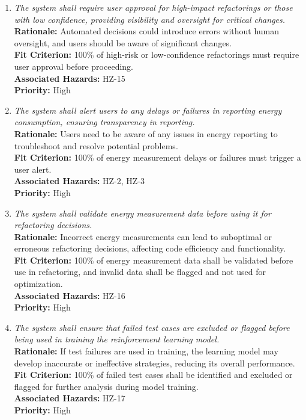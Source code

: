 \documentclass{article}
\begin{document}
\begin{enumerate}[label=SCR \arabic*., wide=0pt, leftmargin=*]
    \item \emph{The system shall require user approval for high-impact refactorings or those with low confidence, providing visibility and oversight for critical changes.}\\
    {\bf Rationale:} Automated decisions could introduce errors without human oversight, and users should be aware of significant changes.\\
    {\bf Fit Criterion:} 100\% of high-risk or low-confidence refactorings must require user approval before proceeding.\\
    {\bf Associated Hazards:} HZ-15\\
    {\bf Priority:} High

    \item \emph{The system shall alert users to any delays or failures in reporting energy consumption, ensuring transparency in reporting.}\\
    {\bf Rationale:} Users need to be aware of any issues in energy reporting to troubleshoot and resolve potential problems.\\
    {\bf Fit Criterion:} 100\% of energy measurement delays or failures must trigger a user alert.\\
    {\bf Associated Hazards:} HZ-2, HZ-3\\
    {\bf Priority:} High

    \item \emph{The system shall validate energy measurement data before using it for refactoring decisions.}\\
    {\bf Rationale:} Incorrect energy measurements can lead to suboptimal or erroneous refactoring decisions, affecting code efficiency and functionality.\\
    {\bf Fit Criterion:} 100\% of energy measurement data shall be validated before use in refactoring, and invalid data shall be flagged and not used for optimization.\\
    {\bf Associated Hazards:} HZ-16\\
    {\bf Priority:} High
    
    \item \emph{The system shall ensure that failed test cases are excluded or flagged before being used in training the reinforcement learning model.}\\
    {\bf Rationale:} If test failures are used in training, the learning model may develop inaccurate or ineffective strategies, reducing its overall performance.\\
    {\bf Fit Criterion:} 100\% of failed test cases shall be identified and excluded or flagged for further analysis during model training.\\
    {\bf Associated Hazards:} HZ-17\\
    {\bf Priority:} High


\end{enumerate}
\end{document}
